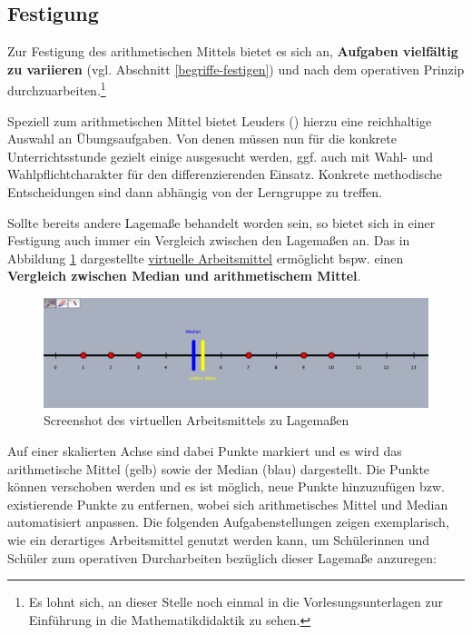 \documentclass[
]{scrbook}
\theoremstyle{definition}
\theoremstyle{definition}
\theoremstyle{definition}
\theoremstyle{definition}
\theoremstyle{remark}
\begin{document}
\subsection{Festigung}\label{festigung-1}

Zur Festigung des arithmetischen Mittels bietet es sich an, \textbf{Aufgaben vielfältig zu variieren} (vgl. Abschnitt \ref{begriffe-festigen}) und nach dem operativen Prinzip durchzuarbeiten.\footnote{Es lohnt sich, an dieser Stelle noch einmal in die Vorlesungsunterlagen zur Einführung in die Mathematikdidaktik zu sehen.}

Speziell zum arithmetischen Mittel bietet Leuders () hierzu eine reichhaltige Auswahl an Übungsaufgaben. Von denen müssen nun für die konkrete Unterrichtsstunde gezielt einige ausgesucht werden, ggf. auch mit Wahl- und Wahlpflichtcharakter für den differenzierenden Einsatz. Konkrete methodische Entscheidungen sind dann abhängig von der Lerngruppe zu treffen.

Sollte bereits andere Lagemaße behandelt worden sein, so bietet sich in einer Festigung auch immer ein Vergleich zwischen den Lagemaßen an. Das in Abbildung \ref{fig:ScreenshotLagemass} dargestellte \href{files/Stoffdidaktik-WiSe2223-Kap11-Lagemasse.html}{virtuelle Arbeitsmittel} ermöglicht bspw. einen \textbf{Vergleich zwischen Median und arithmetischem Mittel}.

\begin{figure}

{\centering \includegraphics[width=0.75\linewidth]{pictures/B-ScreenshotLagemass} 

}

\caption{Screenshot des virtuellen Arbeitsmittels zu Lagemaßen}\label{fig:ScreenshotLagemass}
\end{figure}

Auf einer skalierten Achse sind dabei Punkte markiert und es wird das arithmetische Mittel (gelb) sowie der Median (blau) dargestellt. Die Punkte können verschoben werden und es ist möglich, neue Punkte hinzuzufügen bzw. existierende Punkte zu entfernen, wobei sich arithmetisches Mittel und Median automatisiert anpassen. Die folgenden Aufgabenstellungen zeigen exemplarisch, wie ein derartiges Arbeitsmittel genutzt werden kann, um Schülerinnen und Schüler zum operativen Durcharbeiten bezüglich dieser Lagemaße anzuregen:
\end{document}
